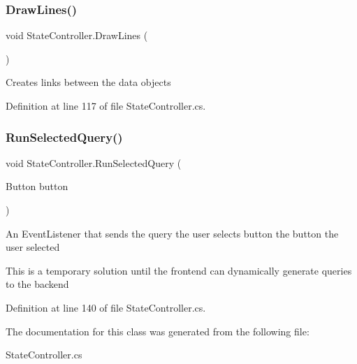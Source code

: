 \subsubsection{\texorpdfstring{Draw\+Lines()}{DrawLines()}}
{\footnotesize\ttfamily void State\+Controller.\+Draw\+Lines (\begin{DoxyParamCaption}{ }\end{DoxyParamCaption})}



Creates links between the data objects 



Definition at line 117 of file State\+Controller.\+cs.

\mbox{\label{class_state_controller_ad262fec81076b9c60735050264d337fd}} 
\subsubsection{\texorpdfstring{Run\+Selected\+Query()}{RunSelectedQuery()}}
{\footnotesize\ttfamily void State\+Controller.\+Run\+Selected\+Query (\begin{DoxyParamCaption}\item[{Button}]{button }\end{DoxyParamCaption})}



An Event\+Listener that sends the query the user selects  button the button the user selected 

This is a temporary solution until the frontend can dynamically generate queries to the backend 

Definition at line 140 of file State\+Controller.\+cs.



The documentation for this class was generated from the following file\+:\begin{DoxyCompactItemize}
\item 
State\+Controller.\+cs\end{DoxyCompactItemize}
